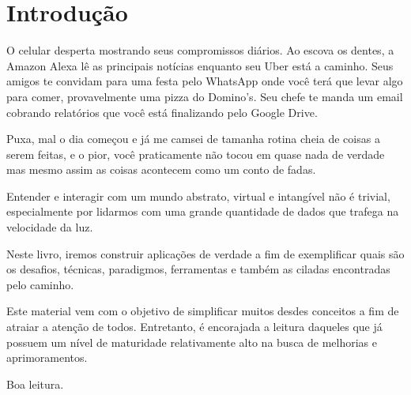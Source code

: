 \chapter{Introdução}

O celular desperta mostrando seus compromissos diários. Ao escova os dentes, a Amazon Alexa lê as principais notícias enquanto seu Uber está a caminho. Seus amigos te convidam para uma festa pelo WhatsApp onde você terá que levar algo para comer, provavelmente uma pizza do Domino's. Seu chefe te manda um email cobrando relatórios que você está finalizando pelo Google Drive.

Puxa, mal o dia começou e já me camsei de tamanha rotina cheia de coisas a serem feitas, e o pior, você praticamente não tocou em quase nada de verdade mas mesmo assim as coisas acontecem como um conto de fadas.

Entender e interagir com um mundo abstrato, virtual e intangível não é trivial, especialmente por lidarmos com uma grande quantidade de dados que trafega na velocidade da luz.

Neste livro, iremos construir aplicações de verdade a fim de exemplificar quais são os desafios, técnicas, paradigmos, ferramentas e também as ciladas encontradas pelo caminho. 

Este material vem com o objetivo de simplificar muitos desdes conceitos a fim de atraiar a atenção de todos. Entretanto, é encorajada a leitura daqueles que já possuem um nível de maturidade relativamente alto na busca de melhorias e aprimoramentos. 

Boa leitura.